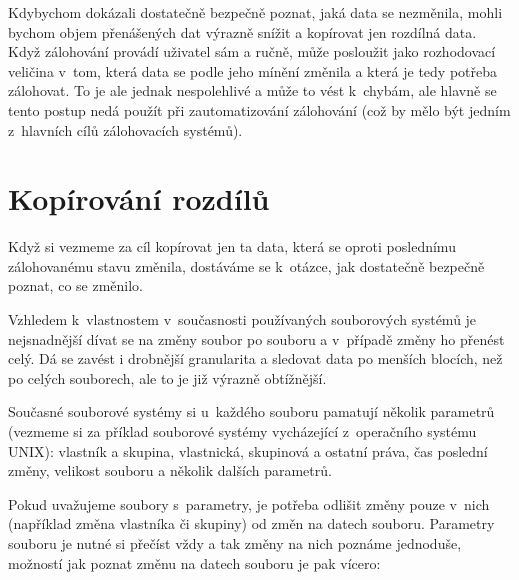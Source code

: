 Kdybychom dokázali dostatečně bezpečně poznat, jaká data se nezměnila, mohli
bychom objem přenášených dat výrazně snížit a kopírovat jen rozdílná data.
Když zálohování provádí uživatel sám a ručně, může posloužit jako rozhodovací
veličina v~tom, která data se podle jeho mínění změnila a která je tedy potřeba
zálohovat. To je ale jednak nespolehlivé a může to vést k~chybám, ale hlavně se
tento postup nedá použít při zautomatizování zálohování (což by mělo být jedním
z~hlavních cílů zálohovacích systémů).

\newpage

\section{Kopírování rozdílů}

Když si vezmeme za cíl kopírovat jen ta data, která se oproti poslednímu
zálohovanému stavu změnila, dostáváme se k~otázce, jak dostatečně bezpečně
poznat, co se změnilo.

Vzhledem k~vlastnostem v~současnosti používaných souborových systémů je
nejsnadnější dívat se na změny soubor po souboru a v~případě změny ho přenést
celý. Dá se zavést i drobnější granularita a sledovat data po menších blocích,
než po celých souborech, ale to je již výrazně obtížnější.


Současné souborové systémy si u~každého souboru pamatují několik parametrů
(vezmeme si za příklad souborové systémy vycházející z~operačního systému
\gls{UNIX}): vlastník a skupina, vlastnická, skupinová a ostatní práva, čas
poslední změny, velikost souboru a několik dalších parametrů.

Pokud uvažujeme soubory s~parametry, je potřeba odlišit změny pouze v~nich
(například změna vlastníka či skupiny) od změn na datech souboru. Parametry
souboru je nutné si přečíst vždy a tak změny na nich poznáme jednoduše, možností
jak poznat změnu na datech souboru je pak vícero:


